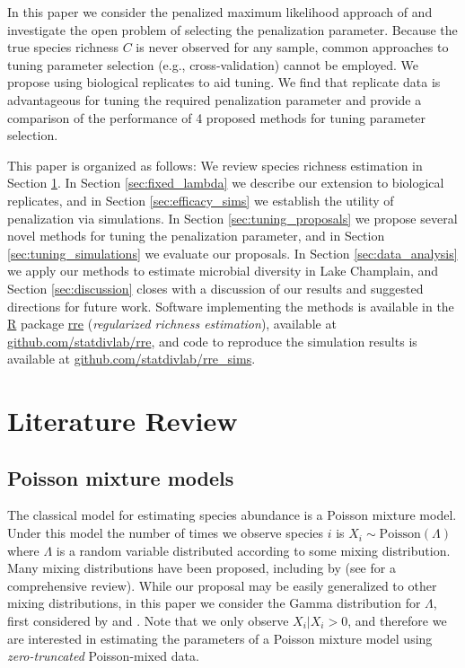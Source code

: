 \documentclass[12pt]{article}
\theoremstyle{break}
\theoremstyle{break}
\begin{document}
In this paper we consider the penalized maximum likelihood approach of \citet{wang_2005} and investigate the open problem of selecting the penalization parameter. Because the true species richness $C$ is never observed for any sample, common approaches to tuning parameter selection (e.g., cross-validation) cannot be employed. We propose using biological replicates to aid tuning. %
We find that replicate data is advantageous for tuning the required penalization parameter and provide a comparison of the performance of 4 proposed methods for tuning parameter selection.

This paper is organized as follows: We review species richness estimation in Section \ref{sec:literature_review}.  In Section \ref{sec:fixed_lambda} we describe our extension to biological replicates, and in Section \ref{sec:efficacy_sims} we establish the utility of penalization via simulations. In Section \ref{sec:tuning_proposals} we propose several novel methods for tuning the penalization parameter, and in Section \ref{sec:tuning_simulations}
we evaluate our proposals. In Section \ref{sec:data_analysis} we apply our methods to estimate microbial diversity in Lake Champlain, and Section \ref{sec:discussion} closes with a discussion of our results and suggested directions for future work. Software implementing the methods is available in the \url{R} package \url{rre} (\textit{regularized richness estimation}), available at \url{github.com/statdivlab/rre}, and code to reproduce the simulation results is available at \url{github.com/statdivlab/rre_sims}.


\section{Literature Review}

\label{sec:literature_review}

\subsection{Poisson mixture models}

The classical model for estimating species abundance is a Poisson mixture model.  Under this model the number of times we observe species $i$ is $X_i \sim \text{Poisson}(\Lambda)$ where $\Lambda$ is a random variable distributed according to some mixing distribution.
Many mixing distributions have been proposed, including by  \cite{bulmer_1974,ord_1986,norris_1998} (see \cite{bunge_1993} for a comprehensive review). While our proposal may be easily generalized to other mixing distributions, in this paper we consider the Gamma  distribution for $\Lambda$, first considered by \citet{greenwood_yule} and \citet{fisher_1943}.
Note that we only observe $X_i | X_i > 0$, and therefore we are interested in estimating the parameters of a Poisson mixture model using \textit{zero-truncated} Poisson-mixed data.
\end{document}
